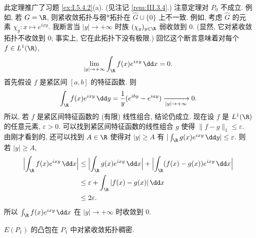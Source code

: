 \begin{remark}[定理不适用于 $P_0$]
\label{rem:III.4.4}
此定理推广了习题 \ref{ex:I.5.4.2}(a). (见注记 \ref{rem:III.3.4}.)
注意定理对 $P_0$ 不成立. 例如, 若 $G = \R$, 则紧收敛拓扑与弱*拓扑在 $\widehat{G} \cup \{0\}$ 上不一致. 例如, 考虑 $\widehat{G}$ 的元素 $\chi_y \colon x \longmapsto e^{ixy}$. 我断言当 $|y| \to +\infty$ 时族 $(\chi_y)_{y \in \R}$ 弱收敛到 $0$. (显然, 它对紧收敛拓扑不收敛到 $0$; 事实上, 它在此拓扑下没有极限.) 回忆这个断言意味着对每个 $f \in L^1(\R)$,
\[
\lim_{|y| \to +\infty}\int_{\R}f(x)e^{ixy}\,\dd x = 0.
\]
首先假设 $f$ 是紧区间 $[a, b]$ 的特征函数. 则
\[
\int_{\R}f(x)e^{ixy}\,\dd y = \frac{1}{y}(e^{iby} - e^{iay}) \xrightarrow[|y| \to +\infty]{} 0.
\]
所以, 若 $f$ 是紧区间特征函数的 (有限) 线性组合, 结论仍成立. 现在设 $f$ 是 $L^1(\R)$ 的任意元素, $\varepsilon > 0$. 可以找到紧区间特征函数的线性组合 $g$ 使得 $\|f - g\|_1 \leq \varepsilon$. 由刚才看到的, 还可以找到 $A \in \R$ 使得对 $|y| \geq A$ 有 $|\int_{\R}g(x)e^{ixy}\,\dd y| \leq \varepsilon$. 则若 $|y| \geq A$,
\begin{align*}
\Bigl|\int_{\R}f(x)e^{ixy}\,\dd x\Bigr| &\leq \Bigl|\int_{\R}g(x)e^{ixy}\,\dd x\Bigr| + \Bigl|\int_{\R}(f(x) - g(x))e^{ixy}\,\dd x\Bigr| \\
&\leq \varepsilon + \int_{\R}|f(x) - g(x)|\,\dd x \\
&\leq 2\varepsilon.
\end{align*}
所以 $\int_{\R}f(x)e^{ixy}\,\dd x$ 在 $|y| \to +\infty$ 时收敛到 $0$.
\end{remark}

\begin{corollary}[紧收敛意义下的稠密性]
\label{cor:III.4.5}
$E(P_1)$ 的凸包在 $P_1$ 中对紧收敛拓扑稠密.
\end{corollary}

